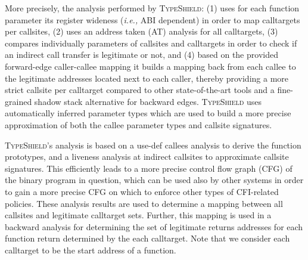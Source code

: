More precisely, the analysis performed by \textsc{TypeShield}:
(1) uses for each function parameter its register wideness (\textit{i.e.,} ABI dependent) in order to map calltargets per callsites,  
(2) uses an address taken (AT) analysis for all calltargets, 
(3) compares individually parameters of callsites and calltargets in order to check if an indirect call transfer is legitimate or not, and
(4) based on the provided forward-edge caller-callee mapping it builds a mapping back from each callee to the legitimate addresses located next to each caller,
thereby providing a more strict callsite per calltarget compared to other state-of-the-art tools and a fine-grained shadow stack alternative for backward edges.
\textsc{TypeShield} uses automatically inferred parameter types which are used to build a more precise approximation of both the callee parameter types and callsite signatures. 

\textsc{TypeShield}'s analysis is based on a use-def callees analysis 
to derive the function prototypes, and a liveness analysis at indirect callsites to approximate callsite signatures. 
This efficiently leads to a more precise control flow graph (CFG) of the binary program in question, 
which can be used also by other systems in order to gain a more precise CFG on which to 
enforce other types of CFI-related policies. These analysis results are used to
determine a mapping between all callsites and legitimate calltarget sets. Further,
this mapping is used in a backward analysis for determining the set of legitimate 
returns addresses for each function return determined by the each calltarget. Note that 
we consider each calltarget to be the start address of a function.

